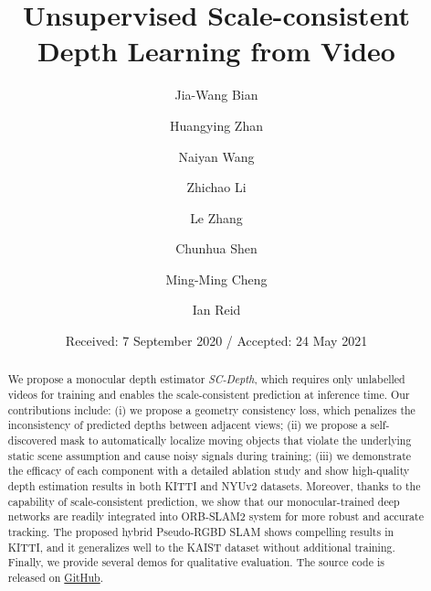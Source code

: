 \documentclass[twocolumn]{svjour3}
\begin{document}
\title{Unsupervised Scale-consistent Depth Learning from Video}


\author{Jia-Wang Bian \and
 		Huangying Zhan \and
    Naiyan Wang \and 
    Zhichao Li \and
    Le Zhang \and
    Chunhua Shen \and
    Ming-Ming Cheng \and
    Ian Reid
}







\date{Received: 7 September 2020 / Accepted: 24 May 2021}

\maketitle

\begin{abstract}
We propose a monocular depth estimator \emph{SC-Depth},
which requires only unlabelled videos for training and enables the scale-consistent prediction at inference time.
Our contributions include: (i) we propose a geometry consistency loss, 
which penalizes the inconsistency of predicted depths between adjacent views;
(ii) we propose a self-discovered mask to automatically localize moving objects that violate the underlying static scene assumption and cause noisy signals during training;
(iii) we demonstrate the efficacy of each component with a detailed ablation study and show high-quality depth estimation results in both KITTI and NYUv2 datasets.
Moreover, thanks to the capability of scale-consistent prediction,
we show that our monocular-trained deep networks are readily integrated into ORB-SLAM2 system for more robust and accurate tracking.
The proposed hybrid Pseudo-RGBD SLAM shows compelling results in KITTI,
and it generalizes well to the KAIST dataset without additional training.
Finally, we provide several demos for qualitative evaluation.
The source code 
is 
 released on \href{https://github.com/JiawangBian/SC-Depth-Release}{GitHub}.

\end{abstract}
\end{document}

